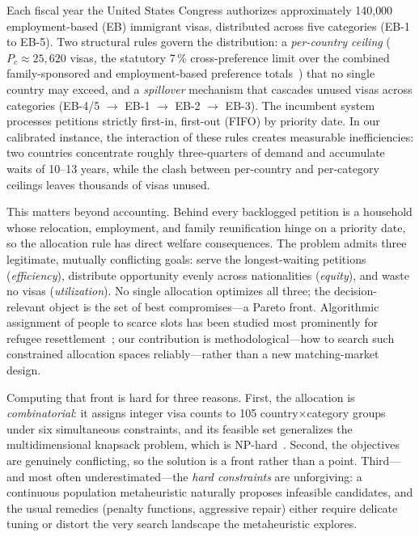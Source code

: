 \documentclass[runningheads]{llncs}
\begin{document}
Each fiscal year the United States Congress authorizes approximately 140{,}000 employment-based (EB) immigrant visas, distributed across five categories (EB-1 to EB-5). Two structural rules govern the distribution: a \emph{per-country ceiling} ($P_c \approx 25{,}620$ visas, the statutory 7\,\% cross-preference limit over the combined family-sponsored and employment-based preference totals~\cite{uscis}) that no single country may exceed, and a \emph{spillover} mechanism that cascades unused visas across categories (EB-4/5 $\rightarrow$ EB-1 $\rightarrow$ EB-2 $\rightarrow$ EB-3). The incumbent system processes petitions strictly first-in, first-out (FIFO) by priority date. In our calibrated instance, the interaction of these rules creates measurable inefficiencies: two countries concentrate roughly three-quarters of demand and accumulate waits of 10--13 years, while the clash between per-country and per-category ceilings leaves thousands of visas unused.

This matters beyond accounting. Behind every backlogged petition is a household whose relocation, employment, and family reunification hinge on a priority date, so the allocation rule has direct welfare consequences. The problem admits three legitimate, mutually conflicting goals: serve the longest-waiting petitions (\emph{efficiency}), distribute opportunity evenly across nationalities (\emph{equity}), and waste no visas (\emph{utilization}). No single allocation optimizes all three; the decision-relevant object is the set of best compromises---a Pareto front. Algorithmic assignment of people to scarce slots has been studied most prominently for refugee resettlement~\cite{bansak}; our contribution is methodological---how to search such constrained allocation spaces reliably---rather than a new matching-market design.

Computing that front is hard for three reasons. First, the allocation is \emph{combinatorial}: it assigns integer visa counts to 105 country$\times$category groups under six simultaneous constraints, and its feasible set generalizes the multidimensional knapsack problem, which is NP-hard~\cite{garey}. Second, the objectives are genuinely conflicting, so the solution is a front rather than a point. Third---and most often underestimated---the \emph{hard constraints} are unforgiving: a continuous population metaheuristic naturally proposes infeasible candidates, and the usual remedies (penalty functions, aggressive repair) either require delicate tuning or distort the very search landscape the metaheuristic explores.
\end{document}
